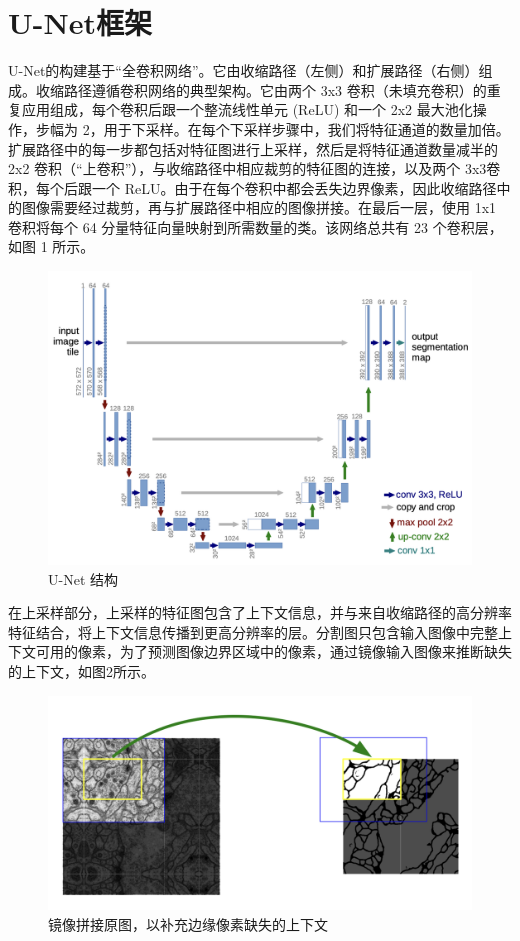\documentclass[letterpaper, 10pt, conference, twoside]{ieeeconf}
\begin{document}
\section{U-Net框架}
U-Net\cite{c3}的构建基于“全卷积网络”。它由收缩路径（左侧）和扩展路径（右侧）组成。收缩路径遵循卷积网络的典型架构。它由两个 3x3 卷积（未填充卷积）的重复应用组成，每个卷积后跟一个整流线性单元 (ReLU) 和一个 2x2 最大池化操作，步幅为 2，用于下采样。在每个下采样步骤中，我们将特征通道的数量加倍。扩展路径中的每一步都包括对特征图进行上采样，然后是将特征通道数量减半的 2x2 卷积（“上卷积”），与收缩路径中相应裁剪的特征图的连接，以及两个 3x3卷积，每个后跟一个 ReLU。由于在每个卷积中都会丢失边界像素，因此收缩路径中的图像需要经过裁剪，再与扩展路径中相应的图像拼接。在最后一层，使用 1x1 卷积将每个 64 分量特征向量映射到所需数量的类。该网络总共有 23 个卷积层，如图 1 所示。
\begin{figure}[htbp]
  \centering
  \includegraphics[width = 1\linewidth]{structure.png}
  \caption{U-Net 结构}
  \label{fig:fig1}
\end{figure}

在上采样部分，上采样的特征图包含了上下文信息，并与来自收缩路径的高分辨率特征结合，将上下文信息传播到更高分辨率的层。分割图只包含输入图像中完整上下文可用的像素，为了预测图像边界区域中的像素，通过镜像输入图像来推断缺失的上下文，如图2所示。

\begin{figure}[htbp]
  \centering
  \includegraphics[width = 1\linewidth]{seamless-seg.png}
  \caption{镜像拼接原图，以补充边缘像素缺失的上下文}
  \label{fig:fig2}
\end{figure}
\end{document}
